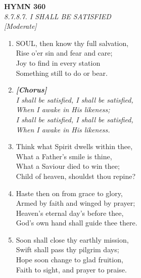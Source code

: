 \newpage
\begin{center}
    {\Large \textbf{HYMN 360}}
    \\
    \textit{8.7.8.7. I SHALL BE SATISFIED}
    \\
    \textit{\small [Moderate]}
\end{center}
\vspace{1em}

\begin{enumerate}
    \item SOUL, then know thy full salvation, \\
        Rise o'er sin and fear and care; \\
        Joy to find in every station \\
        Something still to do or bear.

    \item[] \vspace{0.4em}
    \textbf{\textit{[Chorus]}} \\
    \textit{I shall be satisfied, I shall be satisfied,} \\
    \textit{When I awake in His likeness;} \\
    \textit{I shall be satisfied, I shall be satisfied,} \\
    \textit{When I awake in His likeness.}
    \vspace{0.4em}

    \item Think what Spirit dwells within thee, \\
        What a Father's smile is thine, \\
        What a Saviour died to win thee; \\
        Child of heaven, shouldst thou repine?

    \item Haste then on from grace to glory, \\
        Armed by faith and winged by prayer; \\
        Heaven's eternal day's before thee, \\
        God's own hand shall guide thee there.

    \item Soon shall close thy earthly mission, \\
        Swift shall pass thy pilgrim days; \\
        Hope soon change to glad fruition, \\
        Faith to sight, and prayer to praise.

\end{enumerate}

